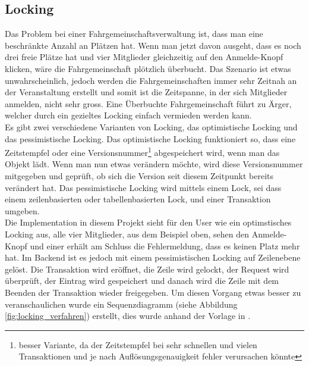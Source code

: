 \subsection{Locking}
Das Problem bei einer Fahrgemeinschaftsverwaltung ist, dass man eine beschränkte Anzahl an Plätzen hat. Wenn man jetzt davon ausgeht, dass es noch drei freie Plätze hat und vier Mitglieder gleichzeitig auf den Anmelde-Knopf klicken, wäre die Fahrgemeinschaft plötzlich überbucht. Das Szenario ist etwas unwahrscheinlich, jedoch werden die Fahrgemeinschaften immer sehr Zeitnah an der Veranstaltung erstellt und somit ist die Zeitspanne, in der sich Mitglieder anmelden, nicht sehr gross. Eine Überbuchte Fahrgemeinschaft führt zu Ärger, welcher durch ein gezieltes Locking einfach vermieden werden kann.\\

Es gibt zwei verschiedene Varianten von Locking, das optimistische Locking und das pessimistische Locking. Das optimistische Locking funktioniert so, dass eine Zeitstempfel oder eine Versionsnummer\footnote{besser Variante, da der Zeitstempfel bei sehr schnellen und vielen Transaktionen und je nach Auflösungsgenauigkeit fehler verursachen könnte} abgespeichert wird, wenn man das Objekt lädt. Wenn man nun etwas verändern möchte, wird diese Versionsnummer mitgegeben und geprüft, ob sich die Version seit diesem Zeitpunkt bereits verändert hat. Das pessimistische Locking wird mittels einem Lock, sei dass einem zeilenbasierten oder tabellenbasierten Lock, und einer Transaktion umgeben.\\

Die Implementation in diesem Projekt sieht für den User wie ein optimstisches Locking aus, alle vier Mitglieder, aus dem Beispiel oben, sehen den Anmelde-Knopf und einer erhält am Schluss die Fehlermeldung, dass es keinen Platz mehr hat. Im Backend ist es jedoch mit einem pessimistischen Locking auf Zeilenebene gelöst. Die Transaktion wird eröffnet, die Zeile wird gelockt, der Request wird überprüft, der Eintrag wird gespeichert und danach wird die Zeile mit dem Beenden der Transaktion wieder freigegeben. Um diesen Vorgang etwas besser zu veranschaulichen wurde ein Sequenzdiagramm (siehe Abbildung \ref{fig:locking_verfahren}) erstellt, dies wurde anhand der Vorlage in \cite{soft_arch_book}.

